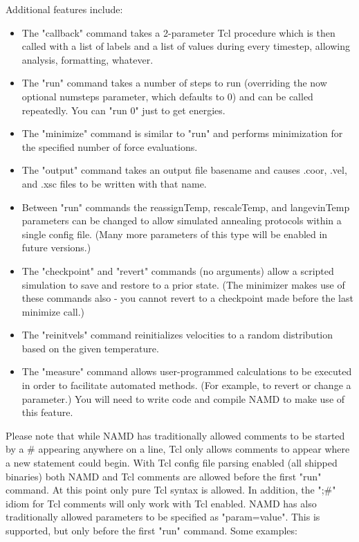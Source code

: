 Additional features include:
\begin{itemize}
 \item The "callback" command takes a 2-parameter Tcl procedure which
    is then called with a list of labels and a list of values during
    every timestep, allowing analysis, formatting, whatever.
 \item The "run" command takes a number of steps to run (overriding the
    now optional numsteps parameter, which defaults to 0) and can be
    called repeatedly.  You can "run 0" just to get energies.
 \item The "minimize" command is similar to "run" and performs
    minimization for the specified number of force evaluations.
 \item The "output" command takes an output file basename and causes
    .coor, .vel, and .xsc files to be written with that name.
 \item Between "run" commands the reassignTemp, rescaleTemp, and
    langevinTemp parameters can be changed to allow simulated
    annealing protocols within a single config file.  (Many more
    parameters of this type will be enabled in future versions.)
 \item The "checkpoint" and "revert" commands (no arguments) allow
    a scripted simulation to save and restore to a prior state.
    (The minimizer makes use of these commands also - you cannot
    revert to a checkpoint made before the last minimize call.)
 \item The "reinitvels" command reinitializes velocities to a
    random distribution based on the given temperature.
 \item The "measure" command allows user-programmed calculations to
    be executed in order to facilitate automated methods.  (For
    example, to revert or change a parameter.)  You will need to
    write code and compile NAMD to make use of this feature.
\end{itemize}

Please note that while NAMD has traditionally allowed comments to be
started by a \# appearing anywhere on a line, Tcl only allows comments
to appear where a new statement could begin.  With Tcl config file
parsing enabled (all shipped binaries) both NAMD and Tcl comments are
allowed before the first "run" command.  At this point only pure Tcl
syntax is allowed.  In addition, the ";\#" idiom for Tcl comments will
only work with Tcl enabled.  NAMD has also traditionally allowed
parameters to be specified as "param=value".  This is supported, but
only before the first "run" command.  Some examples:

